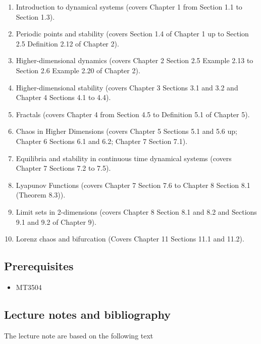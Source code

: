 \documentclass[
  a4paper,
  oneside,
  final]{krantz}
\providecommand{\tightlist}{%
  \setlength{\itemsep}{0pt}\setlength{\parskip}{0pt}}
\theoremstyle{definition}
\theoremstyle{definition}
\theoremstyle{definition}
\theoremstyle{definition}
\theoremstyle{remark}
\begin{document}
\begin{enumerate}
\def\labelenumi{\arabic{enumi}.}
\tightlist
\item
  Introduction to dynamical systems (covers Chapter 1 from Section 1.1 to Section 1.3).
\item
  Periodic points and stability (covers Section 1.4 of Chapter 1 up to Section 2.5 Definition 2.12 of Chapter 2).
\item
  Higher-dimensional dynamics (covers Chapter 2 Section 2.5 Example 2.13 to Section 2.6 Example 2.20 of Chapter 2).
\item
  Higher-dimensional stability (covers Chapter 3 Sections 3.1 and 3.2 and Chapter 4 Sections 4.1 to 4.4).
\item
  Fractals (covers Chapter 4 from Section 4.5 to Definition 5.1 of Chapter 5).
\item
  Chaos in Higher Dimensions (covers Chapter 5 Sections 5.1 and 5.6 up; Chapter 6 Sections 6.1 and 6.2; Chapter 7 Section 7.1).
\item
  Equilibria and stability in continuous time dynamical systems (covers Chapter 7 Sections 7.2 to 7.5).
\item
  Lyapunov Functions (covers Chapter 7 Section 7.6 to Chapter 8 Section 8.1 (Theorem 8.3)).
\item
  Limit sets in 2-dimensions (covers Chapter 8 Section 8.1 and 8.2 and Sections 9.1 and 9.2 of Chapter 9).
\item
  Lorenz chaos and bifurcation (Covers Chapter 11 Sections 11.1 and 11.2).
\end{enumerate}

\hypertarget{prerequisites}{%
\subsection*{Prerequisites}\label{prerequisites}}


\begin{itemize}
\tightlist
\item
  MT3504
\end{itemize}

\hypertarget{lecture-notes-and-bibliography}{%
\subsection*{Lecture notes and bibliography}\label{lecture-notes-and-bibliography}}


The lecture note are based on the following text \citep{ASY}
\end{document}
